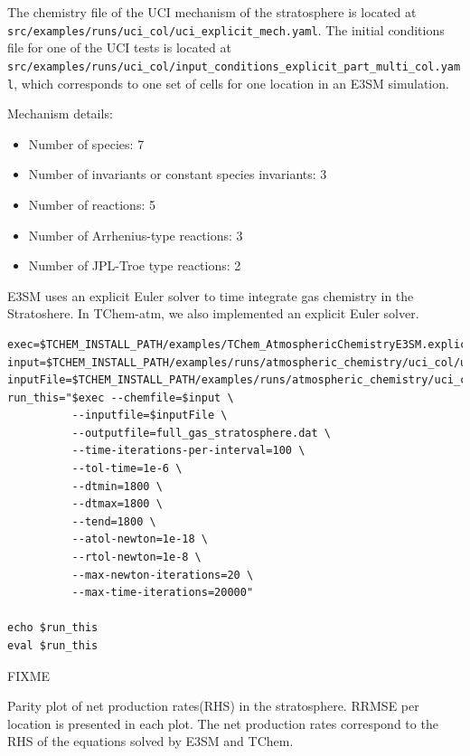 \documentclass[report, 12pt]{SANDreport}
\begin{document}
The chemistry file of the UCI mechanism of the stratosphere is located at \verb|src/examples/runs/uci_col/uci_explicit_mech.yaml|. The initial conditions file for one of the UCI tests is located at \verb|src/examples/runs/uci_col/input_conditions_explicit_part_multi_col.yaml|, which corresponds to one set of cells for one location in an E3SM simulation.

Mechanism details:

\begin{itemize}
    \item Number of species: 7
    \item Number of invariants or constant species invariants: 3
    \item Number of reactions: 5
    \item Number of Arrhenius-type reactions: 3
    \item Number of JPL-Troe type reactions: 2
\end{itemize}

E3SM uses an explicit Euler solver to time integrate gas chemistry in the Stratoshere. In TChem-atm, we also implemented an explicit Euler solver.


\begin{verbatim}
exec=$TCHEM_INSTALL_PATH/examples/TChem_AtmosphericChemistryE3SM.explicit_euler.x
input=$TCHEM_INSTALL_PATH/examples/runs/atmospheric_chemistry/uci_col/uci_explicit_mech.yaml
inputFile=$TCHEM_INSTALL_PATH/examples/runs/atmospheric_chemistry/uci_col/input_conditions_explicit_part_multi_col.yaml
run_this="$exec --chemfile=$input \
          --inputfile=$inputFile \
          --outputfile=full_gas_stratosphere.dat \
          --time-iterations-per-interval=100 \
          --tol-time=1e-6 \
          --dtmin=1800 \
          --dtmax=1800 \
          --tend=1800 \
          --atol-newton=1e-18 \
          --rtol-newton=1e-8 \
          --max-newton-iterations=20 \
          --max-time-iterations=20000"

echo $run_this
eval $run_this
\end{verbatim}


FIXME

Parity plot of net production rates(RHS) in the stratosphere. RRMSE per location is presented in each plot. The net production rates correspond to the RHS of the equations solved by E3SM and TChem.



%   
\end{document}
